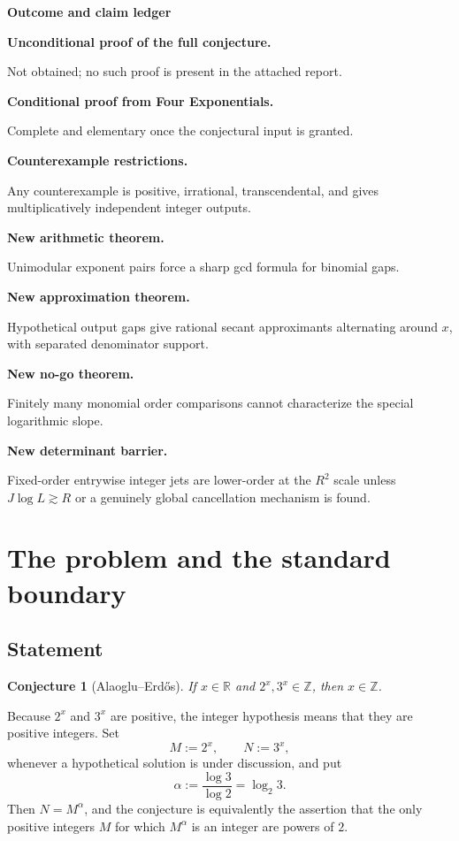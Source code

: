 \documentclass[11pt,oneside]{article}
\newtheorem{conjecture}[theorem]{Conjecture}
\theoremstyle{definition}
\theoremstyle{remark}
\newenvironment{claimbox}[1]{%
  \def\FrameCommand{\fcolorbox{deepblue}{softblue}}%
  \MakeFramed{\advance\hsize-2\width\FrameRestore}%
  \noindent\textbf{#1}\par\smallskip
}{\endMakeFramed}
\newcommand{\Z}{\mathbb Z}
\newcommand{\R}{\mathbb R}
\newcommand{\AEconj}{Alaoglu--Erd\H{o}s}
\begin{document}
\clearpage
\begin{claimbox}{Outcome and claim ledger}
\noindent\textbf{Unconditional proof of the full conjecture.}\par
Not obtained; no such proof is present in the attached report.\medskip

\noindent\textbf{Conditional proof from Four Exponentials.}\par
Complete and elementary once the conjectural input is granted.\medskip

\noindent\textbf{Counterexample restrictions.}\par
Any counterexample is positive, irrational, transcendental, and gives multiplicatively independent integer outputs.\medskip

\noindent\textbf{New arithmetic theorem.}\par
Unimodular exponent pairs force a sharp gcd formula for binomial gaps.\medskip

\noindent\textbf{New approximation theorem.}\par
Hypothetical output gaps give rational secant approximants alternating around $x$, with separated denominator support.\medskip

\noindent\textbf{New no-go theorem.}\par
Finitely many monomial order comparisons cannot characterize the special logarithmic slope.\medskip

\noindent\textbf{New determinant barrier.}\par
Fixed-order entrywise integer jets are lower-order at the $R^2$ scale unless $J\log L\gtrsim R$ or a genuinely global cancellation mechanism is found.
\end{claimbox}

\tableofcontents
\newpage

\section{The problem and the standard boundary}

\subsection{Statement}

\begin{conjecture}[\AEconj{}]
\label{conj:AE}
If $x\in\R$ and $2^x,3^x\in\Z$, then $x\in\Z$.
\end{conjecture}

Because $2^x$ and $3^x$ are positive, the integer hypothesis means that they
are positive integers.  Set
\begin{equation}
  M:=2^x,\qquad N:=3^x,
  \label{eq:MN}
\end{equation}
whenever a hypothetical solution is under discussion, and put
\begin{equation}
  \alpha:=\frac{\log 3}{\log 2}=\log_2 3.
  \label{eq:alpha}
\end{equation}
Then $N=M^\alpha$, and the conjecture is equivalently the assertion that the
only positive integers $M$ for which $M^\alpha$ is an integer are powers of
$2$.
\end{document}
